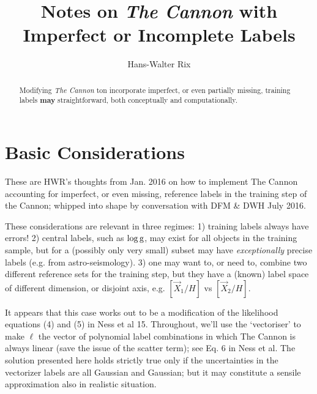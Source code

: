 \documentclass[12pt, letterpaper, preprint]{aastex}
\newcommand{\logg}{\mbox{$\rm \log g$}}
\begin{document}
\title{Notes on {\it The Cannon} with \\Imperfect or Incomplete Labels}
%
%
\author{Hans-Walter Rix}
%
%


\maketitle              %

\begin{abstract}
Modifying {\it The Cannon} ton incorporate imperfect, or even partially missing, training labels  {\bf may} straightforward, both conceptually and computationally.
\end{abstract}
%
\section{Basic Considerations}

These are HWR’s thoughts from Jan. 2016 on how to implement The Cannon accounting for imperfect, or even missing, reference labels in the training step of the Cannon; whipped into shape by conversation with DFM \& DWH July 2016.

These considerations are relevant in three regimes: 1) training labels always have errors! 2) central labels, such as \logg , may exist for all objects in the training sample, but for a (possibly only very small) 
subset may have {\it exceptionally} precise labels (e.g. from astro-seismology). 3) one may want to, or need to, combine two different reference sets for the training step, but they have a (known) label space of different dimension, or disjoint axis, e.g. $[\vec{X}_1/H]$ vs $[\vec{X}_2/H]$.

It appears that this case works out to be a modification of the likelihood equations (4) and (5) in Ness et al 15.
Throughout, we’ll use the ‘vectoriser’ to make $\ell$ the vector of polynomial label combinations in which The Cannon is always linear (save the issue of the scatter term); see Eq. 6 in Ness et al. The solution presented here 
holds strictly true only if the uncertainties in the vectorizer labels are all Gaussian and Gaussian; but it may constitute a sensile approximation also in realistic situation.
\end{document}
